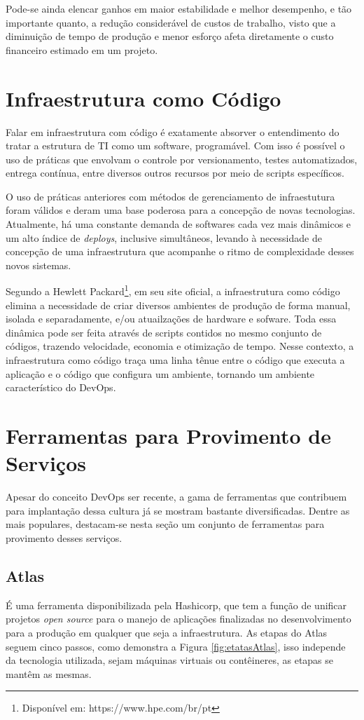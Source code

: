 Pode-se ainda elencar ganhos em maior estabilidade e melhor desempenho, e tão importante quanto, a redução considerável de custos de trabalho, visto que a diminuição de tempo de produção e menor esforço afeta diretamente o custo financeiro estimado em um projeto.


\section{Infraestrutura como Código}
Falar em infraestrutura com código é exatamente absorver o entendimento do tratar a estrutura de TI como um software, programável. Com isso é possível o uso de práticas que envolvam o controle por versionamento, testes automatizados, entrega contínua, entre diversos outros recursos por meio de scripts específicos.

O uso de práticas anteriores com métodos de gerenciamento de infraestutura foram válidos e deram uma base poderosa para a concepção de novas tecnologias. Atualmente, há  uma constante demanda de softwares cada vez mais dinâmicos e um alto índice de \textit{deploys}, inclusive simultâneos, levando à necessidade de concepção de uma infraestrutura que acompanhe o ritmo de complexidade desses novos sistemas.\cite{humble2014entrega}

Segundo a Hewlett Packard\footnote{Disponível em: https://www.hpe.com/br/pt}, em seu site oficial, a infraestrutura como código elimina a necessidade de criar diversos ambientes de produção de forma manual, isolada e separadamente, e/ou atuailzações de hardware e sofware. Toda essa dinâmica pode ser feita através de scripts contidos no mesmo conjunto de códigos, trazendo velocidade, economia e otimização de tempo. Nesse contexto, a infraestrutura como código traça uma linha tênue entre o código que executa a aplicação e o código que configura um ambiente, tornando um ambiente característico do DevOps.


\section{Ferramentas para Provimento de Serviços}
Apesar do conceito DevOps ser recente, a gama de ferramentas que contribuem para implantação dessa cultura já se mostram bastante diversificadas. Dentre as mais populares, destacam-se nesta seção um conjunto de ferramentas para provimento desses serviços.

\subsection{Atlas}
É uma ferramenta disponibilizada pela Hashicorp, que tem a função de unificar projetos \textit{open source} para o manejo de aplicações finalizadas no desenvolvimento para a produção em qualquer que seja a infraestrutura.
As etapas do Atlas seguem cinco passos, como demonstra a Figura \ref{fig:etatasAtlas}, isso independe da tecnologia utilizada, sejam máquinas virtuais ou contêineres, as etapas se mantêm as mesmas. \cite{hashimoto}

